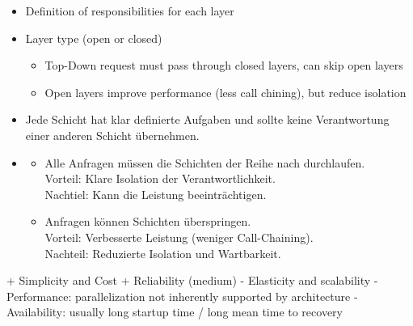 \begin{defBox}[title=Decisions concerning architecture]
    \begin{itemize}
        \item Definition of responsibilities for each layer
        \item Layer type (open or closed)
        \begin{itemize}
            \item Top-Down request must pass through closed layers, can skip open layers
            \item Open layers improve performance (less call chining), but reduce isolation
        \end{itemize}
    \end{itemize}
\end{defBox}
\begin{infoBox}[title=Entscheidungen bei der Architektur]
    \begin{itemize}
        \item {} Jede Schicht hat klar definierte Aufgaben und sollte keine Verantwortung einer anderen Schicht übernehmen.
        \item {}
        \begin{itemize}
            \item {} Alle Anfragen müssen die Schichten der Reihe nach durchlaufen.\\
            Vorteil: Klare Isolation der Verantwortlichkeit.\\
            Nachtiel: Kann die Leistung beeinträchtigen.
            \item {} Anfragen können Schichten überspringen.\\
            Vorteil: Verbesserte Leistung (weniger Call-Chaining).\\
            Nachteil: Reduzierte Isolation und Wartbarkeit.
        \end{itemize}
    \end{itemize}
\end{infoBox}
\begin{defBox}[title=Trade Offs (selection)]
    + Simplicity and Cost
    + Reliability (medium)
    - Elasticity and scalability 
    - Performance: parallelization not inherently supported by architecture
    - Availability: usually long startup time / long mean time to recovery
\end{defBox}
